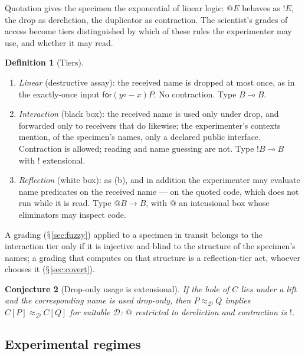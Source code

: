\documentclass[11pt]{article}
\makeatletter
\theoremstyle{definition}
\newtheorem{definition}{Definition}[section]
\theoremstyle{plain}
\newtheorem{conjecture}[definition]{Conjecture}
\theoremstyle{remark}
\newcommand{\quo}[1]{@#1}
\newcommand{\Obs}{\mathcal{D}}
\newcommand{\bisim}{\approx}
\DeclareRobustCommand{\S}{\ifmmode\mathsection\else$\mathsection$\fi}
\makeatother
\begin{document}
Quotation gives the specimen the exponential of linear logic: $\quo{E}$
behaves as $!E$, the drop as dereliction, the duplicator as contraction.
The scientist's grades of access become tiers distinguished by which of
these rules the experimenter may use, and whether it may read.

\begin{definition}[Tiers]\label{def:tiers}
\begin{enumerate}[label=(\alph*),leftmargin=2.2em]
\item \emph{Linear} (destructive assay): the received name is dropped at
most once, as in the exactly-once input $\mathsf{for}(y
\mathrel{\circ\!\!-} x)P$. No contraction. Type $B \multimap B$.
\item \emph{Interaction} (black box): the received name is used only under
drop, and forwarded only to receivers that do likewise; the experimenter's
contexts mention, of the specimen's names, only a declared public
interface. Contraction is allowed; reading and name guessing are not.
Type ${!}B \multimap B$ with $!$ extensional.
\item \emph{Reflection} (white box): as (b), and in addition the
experimenter may evaluate name predicates on the received name --- on
the quoted code, which does not run while it is read. Type $@B
\rightarrow B$, with $@$ an intensional box whose eliminators may inspect
code.
\end{enumerate}
\end{definition}

A grading (\S\ref{sec:fuzzy}) applied to a specimen in transit belongs
to the interaction tier only if it is injective and blind to the
structure of the specimen's names; a grading that computes on that
structure is a reflection-tier act, whoever chooses it
(\S\ref{sec:covert}).

\begin{conjecture}[Drop-only usage is extensional]\label{conj:dropOnly}
If the hole of $C$ lies under a lift and the corresponding name is used
drop-only, then $P \bisim_\Obs Q$ implies $C[P] \bisim_\Obs C[Q]$ for
suitable $\Obs$: $@$ restricted to dereliction and contraction is $!$.
\end{conjecture}

\subsection{Experimental regimes}\label{sec:regimes}
\end{document}
